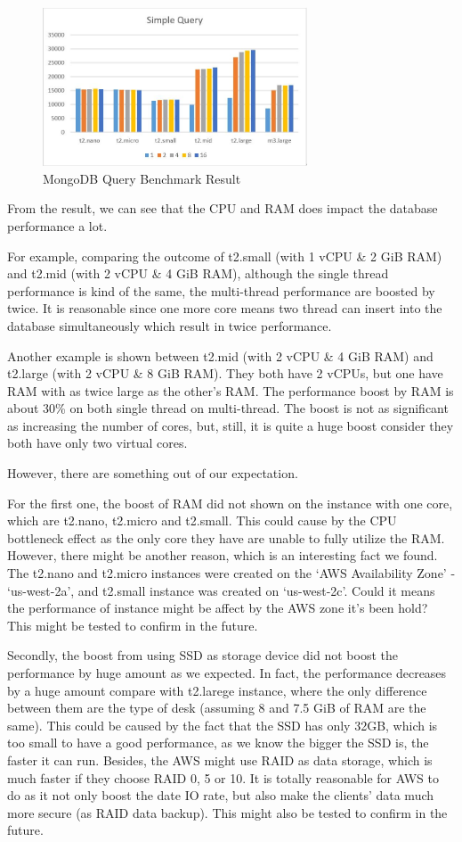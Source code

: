 \documentclass[10pt,letterpaper]{article}
\begin{document}
	\begin{figure}[!h]
	\includegraphics[width=0.7\textwidth]{mongo_query.jpg}
	\centering
	\caption {MongoDB Query Benchmark Result}
	\end{figure}
From the result, we can see that the CPU and RAM does impact the database performance a lot. 

For example, comparing the outcome of t2.small (with 1 vCPU \& 2 GiB RAM) and t2.mid (with 2 vCPU \& 4 GiB RAM), although the single thread performance is kind of the same, the multi-thread performance are boosted by twice.  It is reasonable since one more core means two thread can insert into the database simultaneously which result in twice performance.

Another example is shown between t2.mid (with 2 vCPU \& 4 GiB RAM) and t2.large (with 2 vCPU \& 8 GiB RAM). They both have 2 vCPUs, but one have RAM with as twice large as the other’s RAM. The performance boost by RAM is about 30\% on both single thread on multi-thread. The boost is not as significant as increasing the number of cores, but, still, it is quite a huge boost consider they both have only two virtual cores.

However, there are something out of our expectation. 

For the first one, the boost of RAM did not shown on the instance with one core, which are t2.nano, t2.micro and t2.small. This could cause by the CPU bottleneck effect as the only core they have are unable to fully utilize the RAM. However, there might be another reason, which is an interesting fact we found. The t2.nano and t2.micro instances were created on the ‘AWS Availability Zone’ - ‘us-west-2a’, and t2.small instance was created on ‘us-west-2c’. Could it means the performance of instance might be affect by the AWS zone it’s been hold? This might be tested to confirm in the future.

Secondly, the boost from using SSD as storage device did not boost the performance by huge amount as we expected. In fact, the performance decreases by a huge amount compare with t2.larege instance, where the only difference between them are the type of desk (assuming 8 and 7.5 GiB of RAM are the same). This could be caused by the fact that the SSD has only 32GB, which is too small to have a good performance, as we know the bigger the SSD is, the faster it can run. Besides, the AWS might use RAID as data storage, which is much faster if they choose RAID 0, 5 or 10. It is totally reasonable for AWS to do as it not only boost the date IO rate, but also make the clients’ data much more secure (as RAID data backup). This might also be tested to confirm in the future.
\end{document}
